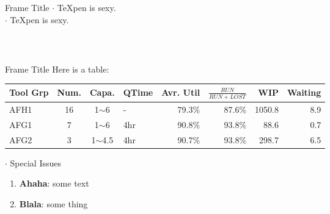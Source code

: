 \documentclass[12pt]{beamer}
\begin{document}
\begin{frame}{Frame Title}
$\cdot$ {\scriptsize  {\TeX}pen is sexy. }\\
$\cdot$ {\scriptsize  {\TeX}pen is sexy.  }

\begin{columns}
\begin{column}{.5\textwidth}
	\begin{center}
	\end{center}
\end{column}
\begin{column}{.5\textwidth}
	\begin{center}
	\end{center}
\end{column}
\end{columns}
\vspace{2cm}
$\;$
\end{frame}



\begin{frame}{Frame Title}
Here is a table:
\scriptsize
\begin{center}
\begin{tabular}{lcclrrrr}
\hline
Tool Grp & Num.  & Capa.  & QTime					& Avr. Util			& $\frac{RUN}{RUN+LOST}$	& WIP	& Waiting \\  \hline
AFH1 &	16  & 1$\sim$6   &   - 					&  79.3\%   			& 87.6\%	& 1050.8	& 8.9 \\
AFG1 &	7   & 1$\sim$6  &  4hr 					&  90.8\%  			& 93.8\%	& 88.6 	& 0.7 \\
AFG2 &	3   & 1$\sim$4.5  & 4hr 					&  90.7\%   			& 93.8\%	& 298.7	& 6.5	\\
\hline
\end{tabular}
\end{center}

$\cdot$ {\small Special Issues}
\begin{enumerate}\setlength{\itemsep}{3mm}
\item {\scriptsize \textbf{Ahaha}:  some text }
\item {\scriptsize \textbf{Blala}: some thing   }
\end{enumerate}
\vspace{2cm}
$\;$
\end{frame}
\end{document}
